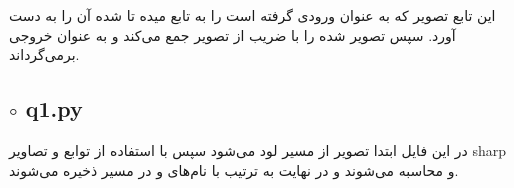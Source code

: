 \documentclass[a4paper,12pt]{article}
\begin{document}
	\subsubsection*{}
	این تابع تصویر 
	که به عنوان ورودی گرفته است را به تابع 
	میده تا 
	شده آن را به دست آورد. سپس تصویر 
	شده را با ضریب 
	از تصویر 
	جمع می‌کند و به عنوان خروجی برمی‌گرداند.
	
	\subsection*{$\circ$ q1.py}
	در این فایل ابتدا تصویر 
	از مسیر 
	لود می‌شود سپس با استفاده از توابع 
	و
	تصاویر 
	sharp
	و 
	محاسبه می‌شوند و در نهایت به ترتیب با نام‌های 
	و
	در مسیر
	ذخیره می‌شوند.
	
	
\end{document}
